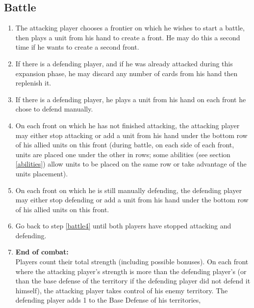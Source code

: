 \documentclass[a4paper]{article}
\begin{document}
    \subsection{Battle}
        \label{battle}
        \begin{enumerate}
            \item The attacking player chooses a frontier on which he wishes to start
                a battle, then plays a unit from his hand to create a front.
                He may do this a second time if he wants to create a second front.
            \item If there is a defending player,
                and if he was already attacked during this expansion phase,
                he may discard any number of cards from his hand then replenish it.
            \item If there is a defending player,
                he plays a unit from his hand on each front he chose to defend manually.
            \item On each front on which he has not finished attacking,
                the attacking player may either stop attacking or add a unit
                from his hand under the bottom row of his allied units on this front
                (during battle, on each side of each front,
                units are placed one under the other in rows; 
                some abilities (see section \ref{abilities}) allow units to be placed
                on the same row or take advantage of the units placement).
                \label{battle4}
            \item On each front on which he is still manually defending,
                the defending player may either stop defending or add a unit
                from his hand under the bottom row of his allied units on this front.
            \item Go back to step \ref{battle4} until both players have stopped
                attacking and defending.
                \label{battle6}
            \item \textbf{End of combat:}\\
                Players count their total strength (including possible bonuses).
                On each front where the attacking player's strength is more than
                the defending player's (or than the base defense of the territory
                if the defending player did not defend it himself),
                the attacking player takes control of his enemy territory.
                The defending player adds 1 to the Base Defense of his territories,

\end{enumerate}
\end{document}

